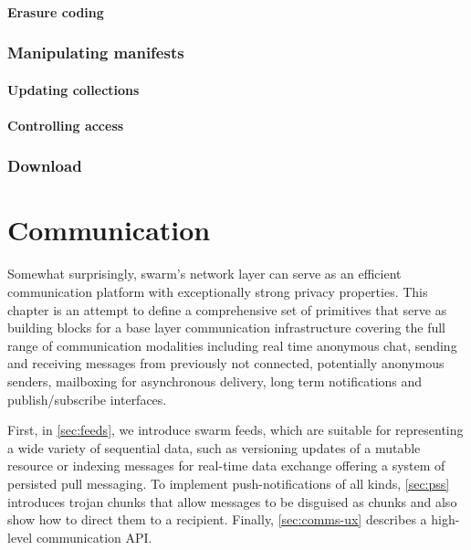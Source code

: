 \subsubsection{Erasure coding}

\subsection{Manipulating manifests}\label{sec:manifests-ux}

\subsubsection{Updating collections} 

\subsubsection{Controlling access}



\subsection{Download}\label{sec:upload}


\chapter{Communication}\label{sec:messaging}

Somewhat surprisingly, swarm's network layer can serve as  an efficient  communication platform with exceptionally strong privacy properties. This chapter is an attempt to define a comprehensive set of primitives that serve as building blocks for a base layer communication infrastructure covering the full range of communication modalities including real time anonymous chat, sending and receiving messages from previously not connected, potentially anonymous senders, mailboxing for asynchronous delivery, long term notifications and  publish/subscribe interfaces. 


First, in \ref{sec:feeds}, we introduce swarm feeds, which are suitable for representing a wide variety of sequential data, such as versioning updates of a mutable resource or indexing messages for real-time data exchange offering a system of persisted pull messaging. To implement push-notifications of all kinds, \ref{sec:pss} introduces trojan chunks that allow messages to be disguised as chunks and also show how to direct them to a recipient. Finally, \ref{sec:comms-ux} describes a high-level communication API. 


